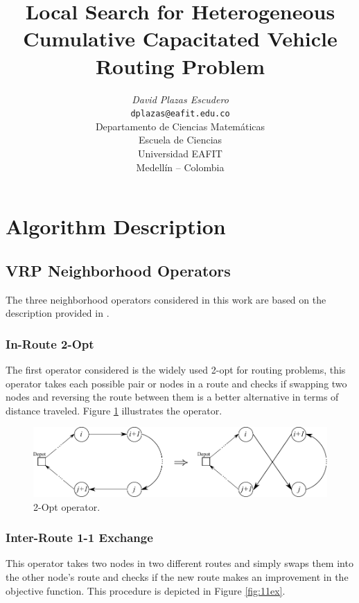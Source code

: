 \documentclass[10pt,twoside]{article}
\title{Local Search for Heterogeneous Cumulative Capacitated Vehicle Routing Problem}
\author{\emph{David Plazas Escudero}\\
\vspace{0.3cm}
\small{\tt{dplazas@eafit.edu.co}}\\
Departamento de Ciencias Matemáticas\\
Escuela de Ciencias\\
Universidad EAFIT\\
Medellín -- Colombia}
\date{}
\begin{document}
\maketitle

\thispagestyle{firststyle}


\section{Algorithm Description}\label{sec_intro}
\subsection{VRP Neighborhood Operators}
The three neighborhood operators considered in this work are based on the description provided in \cite{layeb2013grasp}.
\subsubsection{In-Route 2-Opt}
The first operator considered is the widely used 2-opt for routing problems, this operator takes each possible pair or nodes in a route and checks if swapping two nodes and reversing the route between them is a better alternative in terms of distance traveled. Figure \ref{fig:2opt} illustrates the operator.

\begin{figure}[H]
    \centering
    \includegraphics[scale=0.73]{figs/2opt.pdf}
    \caption{2-Opt operator.}
    \label{fig:2opt}
\end{figure}

\subsubsection{Inter-Route 1-1 Exchange}
This operator takes two nodes in two different routes and simply swaps them into the other node's route and checks if the new route makes an improvement in the objective function. This procedure is depicted in Figure \ref{fig:11ex}.
\end{document}
